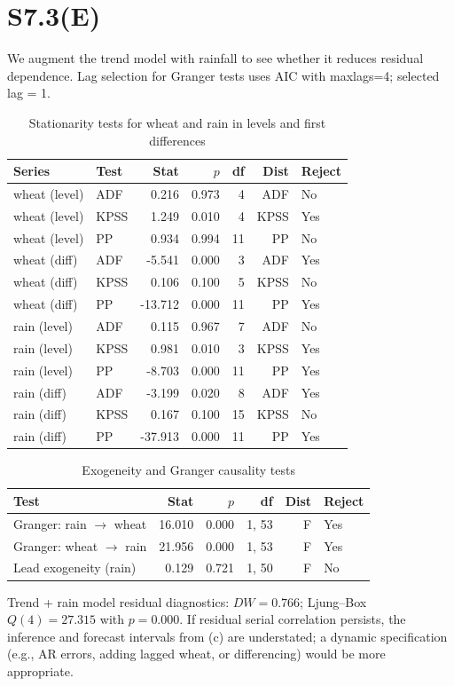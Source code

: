 \documentclass{article}
\begin{document}
\section*{S7.3(E)}
We augment the trend model with rainfall to see whether it reduces residual dependence. 
Lag selection for Granger tests uses AIC with maxlags=4; selected lag = 1.

\begin{table}[H]
\centering
\begin{tabular}{llrrrrl}
\hline
Series & Test & Stat & $p$ & df & Dist & Reject \\
\hline
wheat (level) & ADF & 0.216 & 0.973 & 4 & ADF & No \\
wheat (level) & KPSS & 1.249 & 0.010 & 4 & KPSS & Yes \\
wheat (level) & PP & 0.934 & 0.994 & 11 & PP & No \\
wheat (diff) & ADF & -5.541 & 0.000 & 3 & ADF & Yes \\
wheat (diff) & KPSS & 0.106 & 0.100 & 5 & KPSS & No \\
wheat (diff) & PP & -13.712 & 0.000 & 11 & PP & Yes \\
rain (level) & ADF & 0.115 & 0.967 & 7 & ADF & No \\
rain (level) & KPSS & 0.981 & 0.010 & 3 & KPSS & Yes \\
rain (level) & PP & -8.703 & 0.000 & 11 & PP & Yes \\
rain (diff) & ADF & -3.199 & 0.020 & 8 & ADF & Yes \\
rain (diff) & KPSS & 0.167 & 0.100 & 15 & KPSS & No \\
rain (diff) & PP & -37.913 & 0.000 & 11 & PP & Yes \\
\hline
\end{tabular}
\caption{Stationarity tests for wheat and rain in levels and first differences}
\end{table}

\begin{table}[H]
\centering
\begin{tabular}{lrrrrl}
\hline
Test & Stat & $p$ & df & Dist & Reject \\
\hline
Granger: rain $\rightarrow$ wheat & 16.010 & 0.000 & 1, 53 & F & Yes \\
Granger: wheat $\rightarrow$ rain & 21.956 & 0.000 & 1, 53 & F & Yes \\
Lead exogeneity (rain) & 0.129 & 0.721 & 1, 50 & F & No \\
\hline
\end{tabular}
\caption{Exogeneity and Granger causality tests}
\end{table}

Trend + rain model residual diagnostics: $DW=0.766$; Ljung--Box $Q(4)=27.315$ with $p=0.000$. 
If residual serial correlation persists, the inference and forecast intervals from (c) are understated; 
a dynamic specification (e.g., AR errors, adding lagged wheat, or differencing) would be more appropriate.
\end{document}
